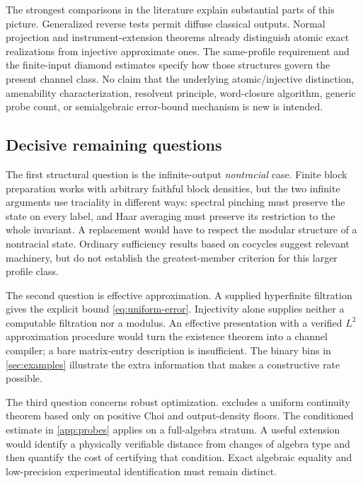 \documentclass[11pt,reqno]{amsart}
\theoremstyle{definition}
\theoremstyle{remark}
\numberwithin{equation}{section}
\begin{document}
The strongest comparisons in the literature explain substantial parts of this picture. Generalized reverse tests permit diffuse classical outputs. Normal projection and instrument-extension theorems already distinguish atomic exact realizations from injective approximate ones. The same-profile requirement and the finite-input diamond estimates specify how those structures govern the present channel class. No claim that the underlying atomic/injective distinction, amenability characterization, resolvent principle, word-closure algorithm, generic probe count, or semialgebraic error-bound mechanism is new is intended.

\subsection{Decisive remaining questions}

The first structural question is the infinite-output \emph{nontracial} case. Finite block preparation works with arbitrary faithful block densities, but the two infinite arguments use traciality in different ways: spectral pinching must preserve the state on every label, and Haar averaging must preserve its restriction to the whole invariant. A replacement would have to respect the modular structure of a nontracial state. Ordinary sufficiency results based on cocycles suggest relevant machinery, but do not establish the greatest-member criterion for this larger profile class.

The second question is effective approximation. A supplied hyperfinite filtration gives the explicit bound \eqref{eq:uniform-error}. Injectivity alone supplies neither a computable filtration nor a modulus. An effective presentation with a verified $L^2$ approximation procedure would turn the existence theorem into a channel compiler; a bare matrix-entry description is insufficient. The binary bins in \cref{sec:examples} illustrate the extra information that makes a constructive rate possible.

The third question concerns robust optimization.  excludes a uniform continuity theorem based only on positive Choi and output-density floors. The conditioned estimate in \cref{app:probes} applies on a full-algebra stratum. A useful extension would identify a physically verifiable distance from changes of algebra type and then quantify the cost of certifying that condition. Exact algebraic equality and low-precision experimental identification must remain distinct.
\end{document}
